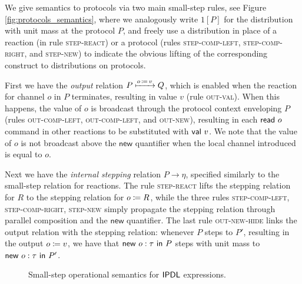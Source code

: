 We give semantics to protocols via two main small-step rules, see Figure \ref{fig:protocols_semantics}, where we analogously write $1[P]$ for the distribution with unit mass at the protocol $P$, and freely use a distribution in place of a reaction (in rule \textsc{step-react}) or a protocol (rules \textsc{step-comp-left}, \textsc{step-comp-right}, and \textsc{step-new}) to indicate the obvious lifting of the corresponding construct to distributions on protocols.

First we have the \emph{output} relation $P \xmapsto{o \, \coloneqq \, v} Q$, which is enabled when the reaction for channel $o$ in $P$ terminates, resulting in value $v$ (rule \textsc{out-val}). When this happens, the value of $o$ is broadcast through the protocol context enveloping $P$ (rules \textsc{out-comp-left}, \textsc{out-comp-left}, and \textsc{out-new}), resulting in each $\mathsf{read} \ o$ command in other reactions to be substituted with $\mathsf{val} \ v$. We note that the value of $o$ is not broadcast above the $\mathsf{new}$ quantifier when the local channel introduced is equal to $o$.

Next we have the \emph{internal stepping} relation $P \to \eta$, specified similarly to the small-step relation for reactions. The rule \textsc{step-react} lifts the stepping relation for $R$ to the stepping relation for $o \coloneqq R$, while the three rules \textsc{step-comp-left}, \textsc{step-comp-right}, \textsc{step-new} simply propagate the stepping relation through parallel composition and the $\mathsf{new}$ quantifier. The last rule \textsc{out-new-hide} links the output relation with the stepping relation: whenever $P$ steps to $P'$, resulting in the output $o \coloneqq v$, we have that $\mathsf{new} \ o : \tau \ \mathsf{in} \ P$ steps with unit mass to $\mathsf{new} \ o : \tau \ \mathsf{in} \ P'$.

\begin{figure}
\caption{Small-step operational semantics for $\textsf{IPDL}$ expressions.} 
\label{fig:expressions_semantics}
\end{figure}

